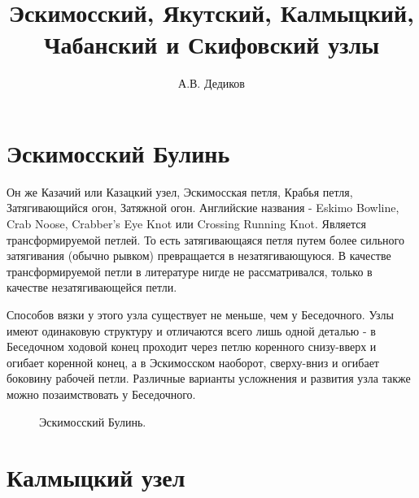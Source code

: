 \documentclass{artikel1}
\begin{document}

\title{Эскимосский, Якутский, Калмыцкий, Чабанский и Скифовский узлы}
\date{}
\author{А.В. Дедиков}

\maketitle

\section{Эскимосский Булинь}

Он же Казачий или Казацкий узел, Эскимосская петля, Крабья петля, Затягивающийся огон, Затяжной огон. Английские названия - Eskimo Bowline, Crab Noose, Crabber’s Eye Knot или Crossing Running Knot. Является трансформируемой петлей. То есть затягивающаяся петля путем более сильного затягивания (обычно рывком) превращается в незатягивающуюся. В качестве трансформируемой петли в литературе нигде не рассматривался, только в качестве незатягивающейся петли.

Способов вязки у этого узла существует не меньше, чем у Беседочного. Узлы имеют одинаковую структуру и отличаются всего лишь одной деталью - в Беседочном ходовой конец проходит через петлю коренного снизу-вверх и огибает коренной конец, а в Эскимосском наоборот, сверху-вниз и огибает боковину рабочей петли. Различные варианты усложнения и развития узла также можно позаимствовать у Беседочного.


\begin{figure}[H]\centering
	\subfloat[Завязывание]{\label{ris:Kazak_1}
	\tcbox[enhanced jigsaw,colframe=black,opacityframe=0.5,opacityback=0.5,height=2cm]
		{\centering
			}
		}
\hfill
	\subfloat[Результат]{\label{ris:Kazak_2}
	\tcbox[enhanced jigsaw,colframe=black,opacityframe=0.5,opacityback=0.5,height=2cm]
		{\centering
			}
		}
\hfill
	\caption{Эскимосский Булинь.}\label{ris:Kazak}
\end{figure}

\section{Калмыцкий узел}
\end{document}
